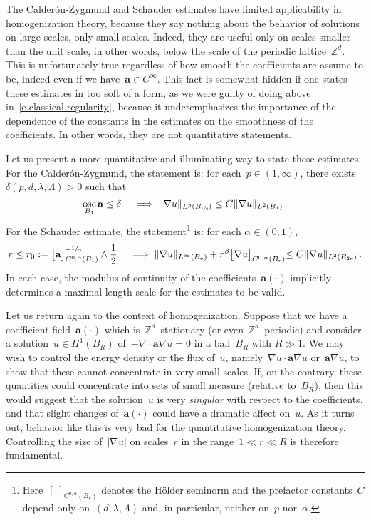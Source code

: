 \documentclass[11pt]{article} %
\numberwithin{equation}{section}
\theoremstyle{definition}
\newcommand*{\Zd}{\ensuremath{\mathbb{Z}^d}}
\renewcommand{\a}{\mathbf{a}}
\DeclareMathOperator*{\osc}{osc}
\begin{document}
\smallskip

The Calder\'on-Zygmund and Schauder estimates have limited applicability in homogenization theory, because they say nothing about the behavior of solutions on large scales, only small scales. Indeed, they are useful only on scales smaller than the unit scale, in other words, below the scale of the periodic lattice~$\Zd$. This is unfortunately true regardless of how smooth the coefficients are assume to be, indeed even if we have~$\a\in C^\infty$. This fact is somewhat hidden if one states these estimates in too soft of a form, as we were guilty of doing above in~\eqref{e.classical.regularity}, because it underemphasizes the importance of the dependence of the constants in the estimates on the smoothness of the coefficients. In other words, they are not quantitative statements. 

\smallskip

Let us present a more quantitative and illuminating way to state these estimates.
For the Calder\'on-Zygmund, the statement is: for each~$p\in(1,\infty)$, there exists~$\delta(p,d,\lambda,\Lambda)>0$ such that 
\begin{equation*}
\osc_{B_1} \a \leq \delta%
\quad 
\implies
\| \nabla u \|_{L^p(B_{\sfrac12})}
\leq C \| \nabla u \|_{L^2(B_{1})}\,.
\end{equation*}
For the Schauder estimate, the statement\footnote{Here~$[\cdot]_{C^{0,\alpha}(B_r)}$ denotes the H\"older seminorm and the prefactor constants~$C$ depend only on~$(d,\lambda,\Lambda)$ and, in particular, neither on~$p$ nor~$\alpha$.} is: for each $\alpha\in (0,1)$, 
\begin{equation}
\label{e.Schauder}
r \leq r_0:= \bigl[ \a \bigr]_{C^{0,\alpha}(B_{1})}^{-\sfrac1\alpha} \wedge \frac12
\quad 
\implies
\| \nabla u \|_{L^\infty(B_{r})}
+ r^\beta \bigl[ \nabla u \bigl]_{C^{0,\alpha}(B_{r})}
\leq C \| \nabla u \|_{L^2(B_{2r})}\,.
\end{equation}
In each case, the modulus of continuity of the coefficients~$\a(\cdot)$ implicitly determines a maximal length scale for the estimates to be valid.

\smallskip

Let us return again to the context of homogenization. Suppose that we have a coefficient field~$\a(\cdot)$ which is~$\Zd$--stationary (or even~$\Zd$--periodic) and consider a solution~$u\in H^1(B_R)$ of~$-\nabla \cdot \a\nabla u=0$ in a ball~$B_R$ with $R\gg 1$. We may wish to control the energy density or the flux of~$u$, namely~$\nabla u \cdot \a\nabla u$ or~$\a\nabla u$, to show that these cannot concentrate in very small scales. If, on the contrary, these quantities could concentrate into sets of small measure (relative to~$B_R$), then this would suggest that the solution~$u$ is very \emph{singular} with respect to the coefficients, and that slight changes of~$\a(\cdot)$ could have a dramatic affect on~$u$. As it turns out, behavior like this is very bad for the quantitative homogenization theory. Controlling the size of~$|\nabla u|$ on scales~$r$ in the range~$1\ll r \ll R$ is therefore fundamental. 
\end{document}
